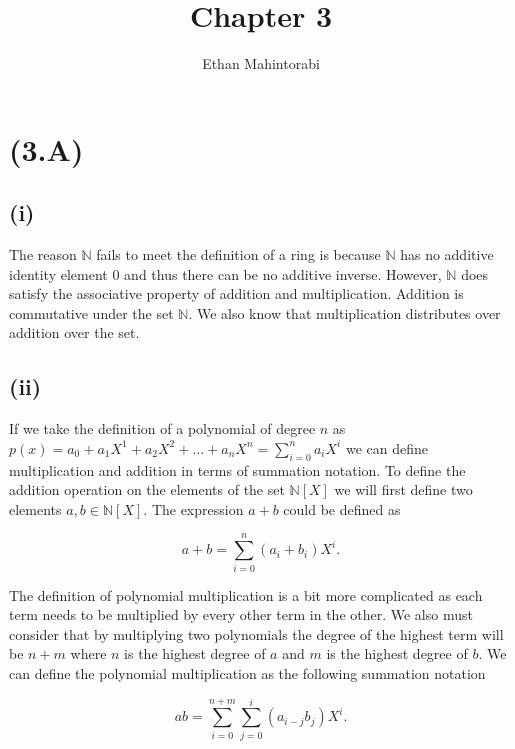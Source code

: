 \documentclass{article}
\begin{document}
  
  \title{Chapter 3}
  \author{Ethan Mahintorabi}
  
  \maketitle

  \section*{(3.A)}
    \subsection*{(i)}
      The reason $\mathbb{N}$ fails to meet the definition of a ring is because $\mathbb{N}$ has no additive identity element $0$ and thus there can be no additive inverse. However, $\mathbb{N}$ does satisfy the associative property of addition and multiplication. Addition is commutative under the set $\mathbb{N}$. We also know that multiplication distributes over addition over the set.

    \subsection*{(ii)}
      If we take the definition of a polynomial of degree $n$ as $p(x) = a_0 + a_1X^1 + a_2X^2 + \dots + a_nX^n=\sum_{i=0}^n a_i X^i$ we can define multiplication and addition in terms of summation notation. To define the addition operation on the elements of the set $\mathbb{N}[X]$ we will first define two elements $a,b \in \mathbb{N}[X]$. The expression $a + b$ could be defined as

      \begin{equation}
        a+b = \sum_{i=0}^{n} (a_i + b_i) X^i.
      \end{equation}

      The definition of polynomial multiplication is a bit more complicated as each term needs to be multiplied by every other term in the other. We also must consider that by multiplying two polynomials the degree of the highest term will be $n+m$ where $n$ is the highest degree of $a$ and $m$ is the highest degree of $b$. We can define the polynomial multiplication as the following summation notation

      \begin{equation}
        ab = \sum_{i=0}^{n+m} \sum_{j=0}^{i} (a_{i-j}b_j) X^i.
      \end{equation}
      
\end{document}

